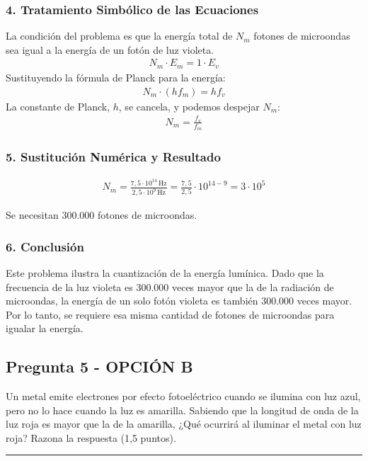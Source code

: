 \subsubsection*{4. Tratamiento Simbólico de las Ecuaciones}
La condición del problema es que la energía total de $N_m$ fotones de microondas sea igual a la energía de un fotón de luz violeta.
\begin{gather}
    N_m \cdot E_m = 1 \cdot E_v
\end{gather}
Sustituyendo la fórmula de Planck para la energía:
\begin{gather}
    N_m \cdot (h f_m) = h f_v
\end{gather}
La constante de Planck, $h$, se cancela, y podemos despejar $N_m$:
\begin{gather}
    N_m = \frac{f_v}{f_m}
\end{gather}

\subsubsection*{5. Sustitución Numérica y Resultado}
\begin{gather}
    N_m = \frac{7,5 \cdot 10^{14}\,\text{Hz}}{2,5 \cdot 10^9\,\text{Hz}} = \frac{7,5}{2,5} \cdot 10^{14-9} = 3 \cdot 10^5
\end{gather}
\begin{cajaresultado}
Se necesitan $\boldsymbol{300.000}$ fotones de microondas.
\end{cajaresultado}

\subsubsection*{6. Conclusión}
\begin{cajaconclusion}
Este problema ilustra la cuantización de la energía lumínica. Dado que la frecuencia de la luz violeta es 300.000 veces mayor que la de la radiación de microondas, la energía de un solo fotón violeta es también 300.000 veces mayor. Por lo tanto, se requiere esa misma cantidad de fotones de microondas para igualar la energía.
\end{cajaconclusion}

\newpage

\subsection{Pregunta 5 - OPCIÓN B}
\label{subsec:5B_2007_sep_ext}

\begin{cajaenunciado}
Un metal emite electrones por efecto fotoeléctrico cuando se ilumina con luz azul, pero no lo hace cuando la luz es amarilla. Sabiendo que la longitud de onda de la luz roja es mayor que la de la amarilla, ¿Qué ocurrirá al iluminar el metal con luz roja? Razona la respuesta (1,5 puntos).
\end{cajaenunciado}
\hrule

